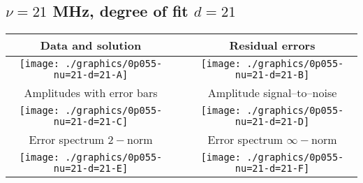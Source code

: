 

% 

\clearpage{}
\break{}

\subsection{$\nu = 21$ MHz, degree of fit $d = 21$}

\begin{table}[h]
    \begin{center}
        \begin{tabular}{ccc}
            Data and solution & \quad & Residual errors \\\hline
            \texttt{[image: ./graphics/0p055-nu=21-d=21-A]} &&
            \texttt{[image: ./graphics/0p055-nu=21-d=21-B]} \\[15pt]
            Amplitudes with error bars && Amplitude signal--to--noise \\\hline
            \texttt{[image: ./graphics/0p055-nu=21-d=21-C]} &&
            \texttt{[image: ./graphics/0p055-nu=21-d=21-D]} \\[15pt]
            Error spectrum $2-$norm && Error spectrum $\infty-$norm \\\hline
            \texttt{[image: ./graphics/0p055-nu=21-d=21-E]} &&
            \texttt{[image: ./graphics/0p055-nu=21-d=21-F]} \\[15pt]
        \end{tabular}
    \end{center}
\label{fig:elev=55, nu=21}
\end{table}



\endinput
